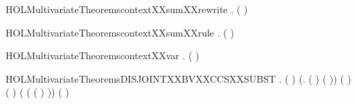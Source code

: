\newcommand{\HOLMultivariateTheoremscontextXXsum}{\UseVerbatim{HOLMultivariateTheoremscontextXXsum}}
\begin{SaveVerbatim}{HOLMultivariateTheoremscontextXXsumXXrewrite}
\HOLTokenTurnstile{} \HOLSymConst{\HOLTokenForall{}}  .
         ( \HOLSymConst{\ensuremath{+}} ) \HOLSymConst{\HOLTokenEquiv{}}    \HOLSymConst{\HOLTokenConj{}}   
\end{SaveVerbatim}
\newcommand{\HOLMultivariateTheoremscontextXXsumXXrewrite}{\UseVerbatim{HOLMultivariateTheoremscontextXXsumXXrewrite}}
\begin{SaveVerbatim}{HOLMultivariateTheoremscontextXXsumXXrule}
\HOLTokenTurnstile{} \HOLSymConst{\HOLTokenForall{}}  .
          \HOLSymConst{\HOLTokenConj{}}    \HOLSymConst{\HOLTokenImp{}}   ( \HOLSymConst{\ensuremath{+}} )
\end{SaveVerbatim}
\newcommand{\HOLMultivariateTheoremscontextXXsumXXrule}{\UseVerbatim{HOLMultivariateTheoremscontextXXsumXXrule}}
\begin{SaveVerbatim}{HOLMultivariateTheoremscontextXXvar}
\HOLTokenTurnstile{} \HOLSymConst{\HOLTokenForall{}} .   ( )
\end{SaveVerbatim}
\newcommand{\HOLMultivariateTheoremscontextXXvar}{\UseVerbatim{HOLMultivariateTheoremscontextXXvar}}
\begin{SaveVerbatim}{HOLMultivariateTheoremsDISJOINTXXBVXXCCSXXSUBST}
\HOLTokenTurnstile{} \HOLSymConst{\HOLTokenForall{}}  .
         \HOLSymConst{\HOLTokenConj{}} (  \HOLSymConst{=}  ) \HOLSymConst{\HOLTokenConj{}}
        (\HOLTokenLambda{}.  ( ) ( ))  \HOLSymConst{\HOLTokenConj{}}
        ( ) ( ) \HOLSymConst{\HOLTokenImp{}}
        ( ( ( \HOLSymConst{\HOLTokenMapto{}} ) )) ( )
\end{SaveVerbatim}
